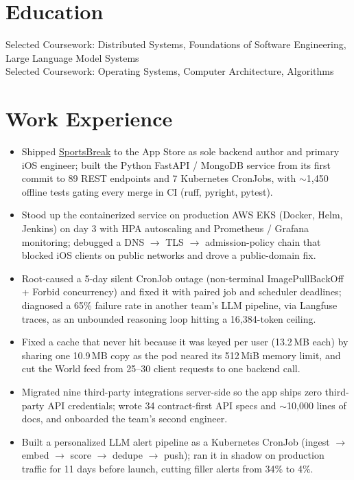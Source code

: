 \documentclass[11pt, letterpaper]{article}
\begin{document}

\section{Education}
Selected Coursework: Distributed Systems, Foundations of Software Engineering, Large Language Model Systems\\[1pt]
Selected Coursework: Operating Systems, Computer Architecture, Algorithms

\section{Work Experience}
\begin{itemize}
  \item Shipped \href{https://apps.apple.com/app/id6762649287}{SportsBreak} to the App Store as sole backend author and primary iOS engineer; built the Python FastAPI / MongoDB service from its first commit to 89 REST endpoints and 7 Kubernetes CronJobs, with $\sim$1{,}450 offline tests gating every merge in CI (ruff, pyright, pytest).
  \item Stood up the containerized service on production AWS EKS (Docker, Helm, Jenkins) on day 3 with HPA autoscaling and Prometheus / Grafana monitoring; debugged a DNS $\to$ TLS $\to$ admission-policy chain that blocked iOS clients on public networks and drove a public-domain fix.
  \item Root-caused a 5-day silent CronJob outage (non-terminal ImagePullBackOff + Forbid concurrency) and fixed it with paired job and scheduler deadlines; diagnosed a 65\% failure rate in another team's LLM pipeline, via Langfuse traces, as an unbounded reasoning loop hitting a 16{,}384-token ceiling.
  \item Fixed a cache that never hit because it was keyed per user (13.2\,MB each) by sharing one 10.9\,MB copy as the pod neared its 512\,MiB memory limit, and cut the World feed from 25--30 client requests to one backend call.
  \item Migrated nine third-party integrations server-side so the app ships zero third-party API credentials; wrote 34 contract-first API specs and $\sim$10{,}000 lines of docs, and onboarded the team's second engineer.
  \item Built a personalized LLM alert pipeline as a Kubernetes CronJob (ingest $\to$ embed $\to$ score $\to$ dedupe $\to$ push); ran it in shadow on production traffic for 11 days before launch, cutting filler alerts from 34\% to 4\%.
\end{itemize}
\end{document}
